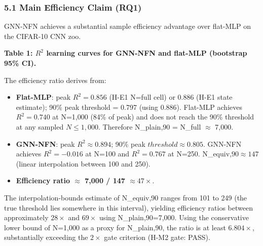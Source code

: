 
\subsubsection{5.1 Main Efficiency Claim (RQ1)}

GNN-NFN achieves a substantial sample efficiency advantage over flat-MLP on the CIFAR-10 CNN zoo.

\textbf{Table 1: $R^2$ learning curves for GNN-NFN and flat-MLP (bootstrap 95\% CI).}

\begin{table}[htbp]
\centering
{}
\end{table}

The efficiency ratio derives from:

\begin{itemize}
\item \textbf{Flat-MLP}: peak $R^{2}=0.856$ (H-E1 N=full cell) or 0.886 (H-E1 state estimate); 90\% peak threshold = 0.797 (using 0.886). Flat-MLP achieves $R^{2}=0.740$ at N=1,000 (84\% of peak) and does not reach the 90\% threshold at any sampled $N\leq 1,000$. Therefore N\_plain,90 = N\_full $\approx$ 7,000.
\item \textbf{GNN-NFN}: peak $R^{2}\approx 0.894$; 90\% peak $threshold\approx 0.805$. GNN-NFN achieves $R^{2}=-0.016$ at N=100 and $R^{2}=0.767$ at N=250. N\_equiv,$90\approx 147$ (linear interpolation between 100 and 250).
\item \textbf{Efficiency ratio $\approx$ 7,000 / 147 $\approx 47\times$}.
\end{itemize}

The interpolation-bounds estimate of N\_equiv,90 ranges from 101 to 249 (the true threshold lies somewhere in this interval), yielding efficiency ratios between approximately $28\times$ and $69\times$ using N\_plain,90=7,000. Using the conservative lower bound of N=1,000 as a proxy for N\_plain,90, the ratio is at least 6.$804\times$, substantially exceeding the $2\times$ gate criterion (H-M2 gate: PASS).

